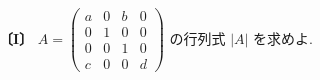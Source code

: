 \noindent\textbf{〔I〕}
$A=\begin{pmatrix}
a & 0 & b & 0\\
0 & 1 & 0 & 0\\
0 & 0 & 1 & 0\\
c & 0 & 0 & d
\end{pmatrix}$ の行列式 $|A|$ を求めよ.
